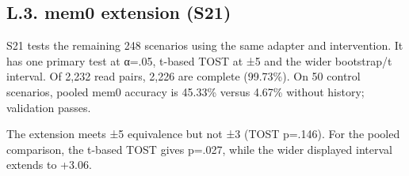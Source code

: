 \documentclass[11pt]{article}
\begin{document}
\endgroup

\label{appendix-l6}

\subsection{L.3. mem0 extension (S21)}\label{l.3.-mem0-extension-s21}

S21 tests the remaining 248 scenarios using the same adapter and intervention. It has one primary test at α=.05, t-based TOST at ±5 and the wider bootstrap/\allowbreak{}t interval. Of 2,232 read pairs, 2,226 are complete (99.73\%). On 50 control scenarios, pooled mem0 accuracy is 45.33\% versus 4.67\% without history; validation passes.

The extension meets ±5 equivalence but not ±3 (TOST p=.146). For the pooled comparison, the t-based TOST gives p=.027, while the wider displayed interval extends to +3.06.
\end{document}
